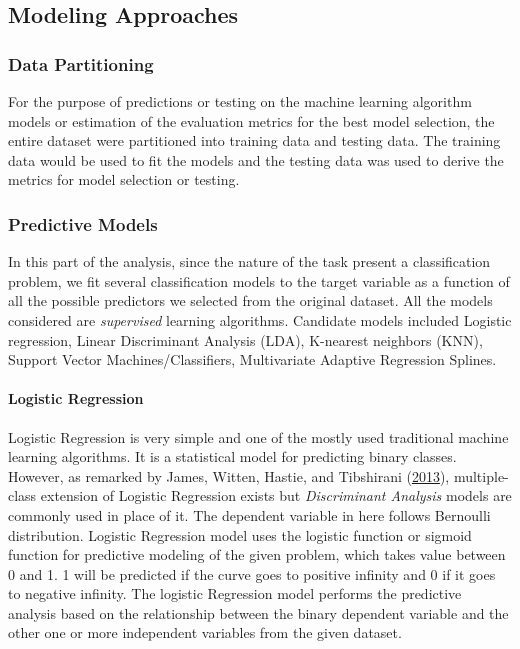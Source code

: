 \documentclass[
  10pt,
]{article}
\begin{document}
\hypertarget{modeling-approaches}{%
\subsection{Modeling Approaches}\label{modeling-approaches}}

\hypertarget{data-partitioning}{%
\subsubsection{Data Partitioning}\label{data-partitioning}}

For the purpose of predictions or testing on the machine learning algorithm models or estimation of the evaluation metrics for the best model selection, the entire dataset were partitioned into training data and testing data. The training data would be used to fit the models and the testing data was used to derive the metrics for model selection or testing.

\subsubsection{Predictive Models}

In this part of the analysis, since the nature of the task present a classification problem, we fit several classification models to the target variable as a function of all the possible predictors we selected from the original dataset. All the models considered are \emph{supervised} learning algorithms. Candidate models included Logistic regression, Linear Discriminant Analysis (LDA), K-nearest neighbors (KNN), Support Vector Machines/Classifiers, Multivariate Adaptive Regression Splines.

\hypertarget{logistic-regression}{%
\paragraph{\texorpdfstring{Logistic Regression }{Logistic Regression  }}\label{logistic-regression}}

Logistic Regression is very simple and one of the mostly used traditional machine learning algorithms. It is a statistical model for predicting binary classes. However, as remarked by James, Witten, Hastie, and Tibshirani (\protect\hyperlink{ref-james2013introduction}{2013}), multiple-class extension of Logistic Regression exists but \emph{Discriminant Analysis} models are commonly used in place of it. The dependent variable in here follows Bernoulli distribution. Logistic Regression model uses the logistic function or sigmoid function for predictive modeling of the given problem, which takes value between 0 and 1. 1 will be predicted if the curve goes to positive infinity and 0 if it goes to negative infinity. The logistic Regression model performs the predictive analysis based on the relationship between the binary dependent variable and the other one or more independent variables from the given dataset.
\end{document}
